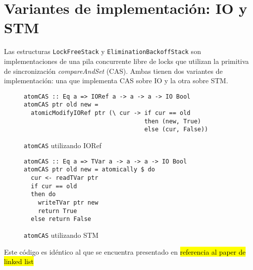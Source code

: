 \section{Variantes de implementación: IO y STM}
Las estructuras \texttt{LockFreeStack} y \texttt{EliminationBackoffStack} son implementaciones de una pila concurrente libre de locks que utilizan la primitiva de sincronización \emph{compareAndSet} (CAS). Ambas tienen dos variantes de implementación: una que implementa CAS sobre IO y la otra sobre STM.

\begin{figure}[H]
\begin{verbatim}
atomCAS :: Eq a => IORef a -> a -> a -> IO Bool
atomCAS ptr old new =
  atomicModifyIORef ptr (\ cur -> if cur == old
                                  then (new, True)
                                  else (cur, False))
\end{verbatim}
\caption{\texttt{atomCAS} utilizando IORef}
\end{figure}

\begin{figure}[H]
\begin{verbatim}
atomCAS :: Eq a => TVar a -> a -> a -> IO Bool
atomCAS ptr old new = atomically $ do
  cur <- readTVar ptr
  if cur == old
  then do
    writeTVar ptr new
    return True
  else return False
\end{verbatim}
\caption{\texttt{atomCAS} utilizando STM}
\end{figure}

Este código es idéntico al que se encuentra presentado en \hl{referencia al paper de linked list}